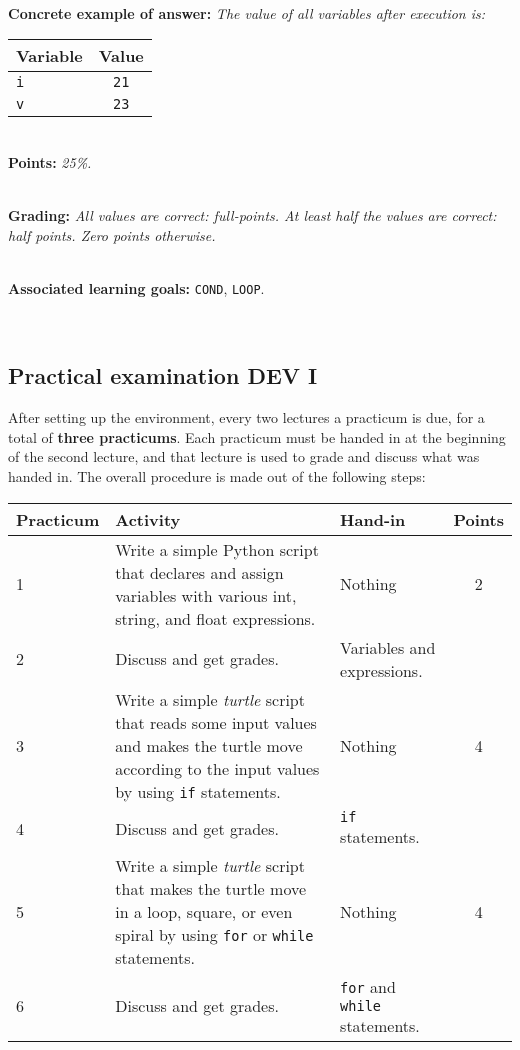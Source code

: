 \documentclass[12pt,a4paper,final]{article}
\begin{document}
\ \\ 

\textbf{Concrete example of answer:} \textit{The value of all variables after execution is:}

\begin{tabular}{| l | c |}
\hline
\textbf{Variable} & \textbf{Value} \\
\hline
\texttt{i} & \texttt{21} \\
\hline
\texttt{v} & \texttt{23} \\
\hline
\end{tabular}

\ \\ 

\textbf{Points:} \textit{25\%.}

\ \\ 

\textbf{Grading:} \textit{All values are correct: full-points. At least half the values are correct: half points. Zero points otherwise.}

\ \\ 

\textbf{Associated learning goals:} \texttt{COND}, \texttt{LOOP}.

\ \\ 

\subsection{Practical examination DEV I}
After setting up the environment, every two lectures a practicum is due, for a total of \textbf{three practicums}. Each practicum must be handed in at the beginning of the second lecture, and that lecture is used to grade and discuss what was handed in. The overall procedure is made out of the following steps:

\begin{tabular}{| l | p{8cm} | p{4cm} | c |}
\hline
\textbf{Practicum} & \textbf{Activity} & \textbf{Hand-in} & Points \\
\hline
1 & Write a simple Python script that declares and assign variables with various int, string, and float expressions. & Nothing & 2 \\
\hline
2 & Discuss and get grades. & Variables and expressions. & \\
\hline
3 & Write a simple \textit{turtle} script that reads some input values and makes the turtle move according to the input values by using \texttt{if} statements. & Nothing & 4 \\
\hline
4 & Discuss and get grades. & \texttt{if} statements. & \\
\hline
5 & Write a simple \textit{turtle} script that makes the turtle move in a loop, square, or even spiral by using \texttt{for} or \texttt{while} statements. & Nothing & 4 \\
\hline
6 & Discuss and get grades. & \texttt{for} and \texttt{while} statements. & \\
\hline
\end{tabular}
\end{document}
